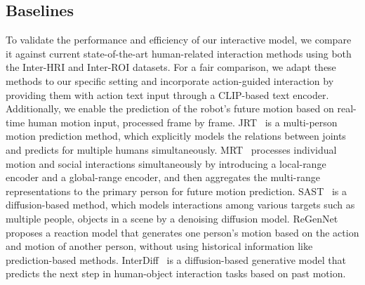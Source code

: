 

\subsection{Baselines}
To validate the performance and efficiency of our interactive model, we compare it against current state-of-the-art human-related interaction methods using both the Inter-HRI and Inter-ROI datasets. For a fair comparison, we adapt these methods to our specific setting and incorporate action-guided interaction by providing them with action text input through a CLIP-based text encoder. Additionally, we enable the prediction of the robot's future motion based on real-time human motion input, processed frame by frame.
JRT~\cite{xu2023joint} is a multi-person motion prediction method, which explicitly models the relations between joints and predicts for multiple humans simultaneously.
MRT~\cite{wang2021multi} processes individual motion and social interactions simultaneously by introducing a local-range encoder and a global-range encoder, and then aggregates the multi-range representations to the primary person for future motion prediction.
SAST~\cite{mueller2024massively} is a diffusion-based method, which models interactions among various targets such as multiple people, objects in a scene by a denoising diffusion model.
ReGenNet~\cite{xu2024regennet} proposes a reaction model that generates one person's motion based on the action and motion of another person, without using historical information like prediction-based methods.
InterDiff~\cite{xu2023inter} is a diffusion-based generative model that predicts the next step in human-object interaction tasks based on past motion. 


